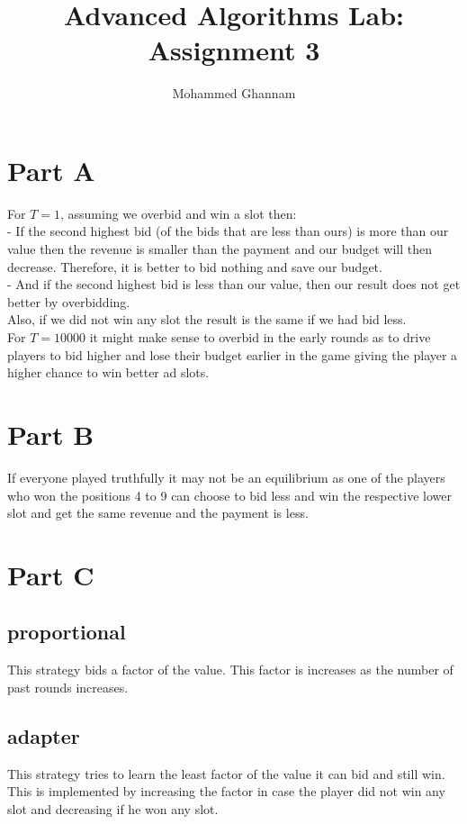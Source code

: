 \documentclass{article}
\author{Mohammed Ghannam}
\title{Advanced Algorithms Lab: Assignment 3}
\theoremstyle{remark}
\theoremstyle{remark}
\begin{document}
\maketitle

\section{Part A}
For $ T=1 $, assuming we overbid and win a slot then: \\ 
- If the second highest bid (of the bids that are less than ours) is more than our value then the revenue is smaller than the payment and our budget will then decrease. Therefore, it is better to bid nothing and save our budget.\\
- And if the second highest bid is less than our value, then our result does not get better by overbidding. \\
Also, if we did not win any slot the result is the same if we had bid less. \\


For $ T=10000 $ it might make sense to overbid in the early rounds as to drive players to bid higher and lose their budget earlier in the game giving the player a higher chance to win better ad slots. 

\section{Part B}
If everyone played truthfully it may not be an equilibrium as one of the players who won the positions 4 to 9 can choose to bid less and win the respective lower slot and get the same revenue and the payment is less.

\section{Part C}
\subsection{proportional}
This strategy bids a factor of the value. This factor is increases as the number of past rounds increases.

\subsection{adapter}
This strategy tries to learn the least factor of the value it can bid and still win. This is implemented by increasing the factor in case the player did not win any slot and decreasing if he won any slot.
\end{document}
